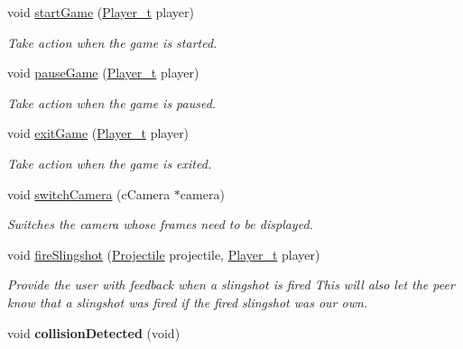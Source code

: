 \begin{DoxyCompactItemize}
\item 
void \hyperlink{classMediator_ad991cce4b9bea0132850b332de7ee692}{startGame} (\hyperlink{namespacePlayer_acc4ced29e6b7e20f602b3c8b60c75228}{Player\_\-t} player)
\begin{DoxyCompactList}\small\item\em Take action when the game is started. \item\end{DoxyCompactList}\item 
void \hyperlink{classMediator_a5586025cfc2d2bedf5cb439c9d70d4d0}{pauseGame} (\hyperlink{namespacePlayer_acc4ced29e6b7e20f602b3c8b60c75228}{Player\_\-t} player)
\begin{DoxyCompactList}\small\item\em Take action when the game is paused. \item\end{DoxyCompactList}\item 
void \hyperlink{classMediator_a5b30bd87401b4a547a1c92edb4e1e7e6}{exitGame} (\hyperlink{namespacePlayer_acc4ced29e6b7e20f602b3c8b60c75228}{Player\_\-t} player)
\begin{DoxyCompactList}\small\item\em Take action when the game is exited. \item\end{DoxyCompactList}\item 
void \hyperlink{classMediator_a71a8bf11835c90379b6b1bc62c2df7b4}{switchCamera} (cCamera $\ast$camera)
\begin{DoxyCompactList}\small\item\em Switches the camera whose frames need to be displayed. \item\end{DoxyCompactList}\item 
void \hyperlink{classMediator_a7b0a7af50706aac37b036ee381753510}{fireSlingshot} (\hyperlink{classProjectile}{Projectile} projectile, \hyperlink{namespacePlayer_acc4ced29e6b7e20f602b3c8b60c75228}{Player\_\-t} player)
\begin{DoxyCompactList}\small\item\em Provide the user with feedback when a slingshot is fired This will also let the peer know that a slingshot was fired if the fired slingshot was our own. \item\end{DoxyCompactList}\item 
\hypertarget{classMediator_a9cb4ea7c083b77853762e1304e54e402}{
void {\bfseries collisionDetected} (void)}
\label{classMediator_a9cb4ea7c083b77853762e1304e54e402}

\end{DoxyCompactItemize}


